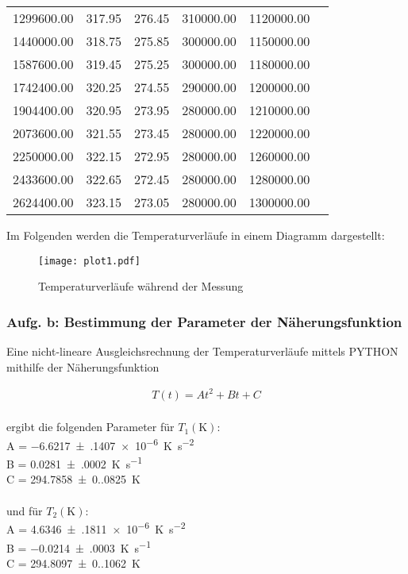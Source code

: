 \begin{table}
\begin{tabular}{c c c c c c}
    1299600.00 &  317.95 &  276.45 & 310000.00 & 1120000.00 \\
    1440000.00 &  318.75 &  275.85 & 300000.00 & 1150000.00 \\
    1587600.00 &  319.45 &  275.25 & 300000.00 & 1180000.00 \\
    1742400.00 &  320.25 &  274.55 & 290000.00 & 1200000.00 \\
    1904400.00 &  320.95 &  273.95 & 280000.00 & 1210000.00 \\
    2073600.00 &  321.55 &  273.45 & 280000.00 & 1220000.00 \\
    2250000.00 &  322.15 &  272.95 & 280000.00 & 1260000.00 \\
    2433600.00 &  322.65 &  272.45 & 280000.00 & 1280000.00 \\
    2624400.00 &  323.15 &  273.05 & 280000.00 & 1300000.00 \\
    \bottomrule
  \end{tabular}
\end{table}

\newpage


Im Folgenden werden die Temperaturverläufe in einem Diagramm dargestellt:

\begin{figure}
  \centering
  \texttt{[image: plot1.pdf]}
  \caption{Temperaturverläufe während der Messung}
  \label{fig:plot}
\end{figure}

\subsubsection{Aufg. b: Bestimmung der Parameter der Näherungsfunktion}

Eine nicht-lineare Ausgleichsrechnung der Temperaturverläufe mittels PYTHON mithilfe der Näherungsfunktion

\begin{align*} 
  T(t) = At^2 + Bt + C 
\end{align*}
\\
ergibt die folgenden Parameter für $T_{1} (\unit{\kelvin})$: \\
A = \qty{-6.6217(1407)e-6}{\unit[per-mode=reciprocal]{\kelvin\per\second\squared}} \\
B = \qty{0.0281(0002)}{\unit[per-mode=reciprocal]{\kelvin\per\second}} \\
C = \qty{294.7858(0.0825)}{\unit\kelvin} \\
\\
und für $T_{2} (\unit{\kelvin})$: \\
A = \qty{4.6346(1811)e-6}{\unit[per-mode=reciprocal]{\kelvin\per\second\squared}} \\
B = \qty{-0.0214(0003)}{\unit[per-mode=reciprocal]{\kelvin\per\second}} \\
C = \qty{294.8097(0.1062)}{\unit\kelvin} \\

